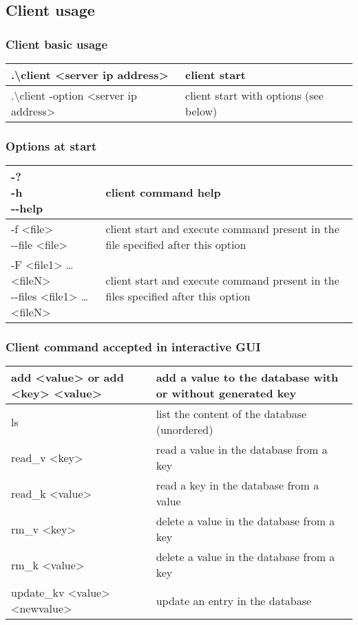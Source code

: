 \documentclass[a4paper,11pt]{report}
\begin{document}
  \subsection*{Client usage}

  \begin{centering}
    \subsubsection*{Client basic usage}
    \begin{tabular}{|m{6cm}|m{6cm}|}

      \hline
      .\textbackslash client <server ip address> & client start \\
      \hline
      .\textbackslash client -option <server ip address> & client start with options (see below) \\
      \hline
    \end{tabular}
    \subsubsection*{Options at start}
    \begin{tabular}{|m{4.5cm}|m{10.5cm}|}
      \hline
      \shortstack{-? \\ -h \\ -{}-help} & client command help \\
      \hline
      \shortstack{-f <file> \\ -{}-file <file>} & client start and execute command present in the file specified after this option \\
      \hline
      \shortstack{-F <file1> \ldots <fileN> \\ -{}-files <file1> \ldots <fileN>} & client start and execute command present in the files specified after this option \\
      \hline
    \end{tabular}

    \subsubsection*{Client command accepted in interactive GUI}
    \begin{tabular}{|m{7cm}|m{8cm}|}
      \hline
      add <value> or add <key> <value> & add a value to the database with or without generated key \\
      \hline
      ls & list the content of the database (unordered) \\
      \hline
      read\_v <key> & read a value in the database from a key \\
      \hline
      read\_k <value> & read a key in the database from a value \\
      \hline
      rm\_v <key> & delete a value in the database from a key \\
      \hline
      rm\_k <value> & delete a value in the database from a key \\
      \hline
      update\_kv <value> <newvalue> & update an entry in the database \\
      \hline
    \end{tabular}
  \end{centering}
\end{document}
